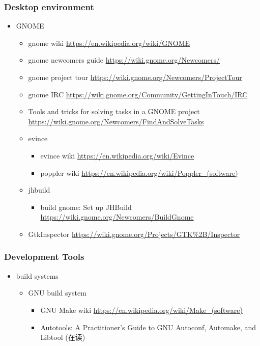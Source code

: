 \documentclass{article}
\begin{document}
\subsubsection{Desktop environment}
%
\begin{itemize}
    \item GNOME
        \begin{itemize}
            \item gnome wiki \url{https://en.wikipedia.org/wiki/GNOME}
            \item gnome newcomers guide \url{https://wiki.gnome.org/Newcomers/}
            \item gnome project tour \url{https://wiki.gnome.org/Newcomers/ProjectTour}
            \item gnome IRC \url{https://wiki.gnome.org/Community/GettingInTouch/IRC}
            \item Tools and tricks for solving tasks in a GNOME project
                  \url{https://wiki.gnome.org/Newcomers/FindAndSolveTasks}
            \item evince
                \begin{itemize}
                    \item evince wiki \url{https://en.wikipedia.org/wiki/Evince}
                    \item poppler wiki \url{https://en.wikipedia.org/wiki/Poppler_(software)}
                \end{itemize}
            \item jhbuild
                \begin{itemize}
                    \item build gnome: Set up JHBuild \url{https://wiki.gnome.org/Newcomers/BuildGnome}
                \end{itemize}
            \item GtkInspector \url{https://wiki.gnome.org/Projects/GTK\%2B/Inspector}
        \end{itemize}
\end{itemize}
%
\subsubsection{Development Tools}
%
\begin{itemize}
    \item build systems
        \begin{itemize}
            \item GNU build system
                \begin{itemize}
                    \item GNU Make wiki \url{https://en.wikipedia.org/wiki/Make_(software)}
                    \item Autotools: A Practitioner's Guide to GNU Autoconf, Automake, and Libtool (在读)
                \end{itemize}
        \end{itemize}
\end{itemize}
%
\end{document}
